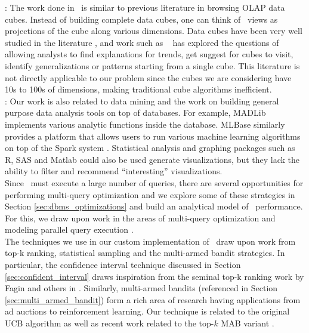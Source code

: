 :
The work done in \VizRecDB\ is similar to previous literature in
browsing OLAP data cubes. 
Instead of building complete data cubes,
one can think of \VizRecDB\ views as projections of the cube along various
dimensions.
 Data cubes have been very well studied in the literature
\cite{DBLP:conf/SIGMOD/HarinarayanRU96, DBLP:jounral/DMKD/GrayCBLR97}, and work such as
~\cite{DBLP:conf/vldb/Sarawagi99, DBLP:conf/vldb/SatheS01,
DBLP:conf/vldb/Sarawagi00, DBLP:conf/SIGKDD/OrdonezC09} has explored the
questions of allowing analysts to find explanations for trends, get suggest for
cubes to visit, identify generalizations or patterns starting from a single
cube. 
This literature is not directly applicable to our problem since the cubes we
are considering have 10s to 100s of dimensions, making traditional cube
algorithms inefficient. \\

:
Our work is also related to data mining and the work on building general purpose
data analysis tools on top of databases. 
For example, MADLib \cite{DBLP:conf/VLDB/HellersteinRSWF12}
implements various analytic functions inside the database. 
MLBase similarly
\cite{DBLP:conf/CIDR/KraskaTDGFJ2013} provides a platform that allows users to
run various machine learning algorithms on top of the Spark system
\cite{DBLP:conf/SCC/ZahariaCFSS10}.
Statistical analysis and graphing packages such as R, SAS and Matlab could also
be used generate visualizations, but they lack the ability to filter and
recommend ``interesting'' visualizations. \\


Since \VizRecDB\ must execute a large number of queries, there are several
opportunities for performing multi-query optimization and we explore some of
these strategies in Section \ref{sec:dbms_optimizations} and build an analytical model of
\VizRecDB\ performance. For this, we draw upon work in the areas of multi-query
optimization and modeling parallel query execution \cite{DBLP:conf/VLDB/WuCHN13,
DBLP:journal/TODS/Sellis1988, DBLP:conf/VLDB/ZukowskiHNB07}. \\

The techniques we use in our custom implementation of \VizRecDB\ draw upon work
from top-k ranking, statistical sampling and the multi-armed bandit strategies. 
In particular, the confidence interval technique discussed in Section
\ref{sec:confident_interval} draws inspiration from the seminal top-k ranking work by Fagin and others in
\cite{DBLP:conf/pods/FaginLN01, DBLP:conf/vldb/IlyasAE04}.
Similarly, multi-armed bandits (referenced in Section
\ref{sec:multi_armed_bandit}) form 
a rich area of research having applications from ad auctions to reinforcement learning. 
Our technique is related to the original UCB algorithm \cite{AuerCF02, LaiR85}
as well as recent work related to the top-$k$ MAB variant \cite{BubeckWV13,
audibert2010best}.


